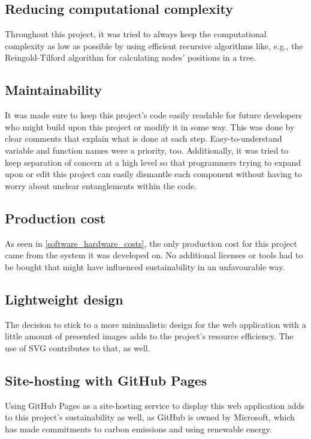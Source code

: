\subsection{Reducing computational complexity}
Throughout this project, it was tried to always keep the computational complexity as low as possible by using efficient recursive algorithms like, e.g., the Reingold-Tilford algorithm for calculating nodes' positions in a tree.

\subsection{Maintainability}
It was made sure to keep this project's code easily readable for future developers who might build upon this project or modify it in some way. This was done by clear comments that explain what is done at each step. Easy-to-understand variable and function names were a priority, too. Additionally, it was tried to keep separation of concern at a high level so that programmers trying to expand upon or edit this project can easily dismantle each component without having to worry about unclear entanglements within the code.

\subsection{Production cost}
As seen in \ref{software_hardware_costs}, the only production cost for this project came from the system it was developed on. No additional licenses or tools had to be bought that might have influenced sustainability in an unfavourable way.

\subsection{Lightweight design}
The decision to stick to a more minimalistic design for the web application with a little amount of presented images adds to the project's resource efficiency. The use of SVG contributes to that, as well.

\subsection{Site-hosting with GitHub Pages}
Using GitHub Pages as a site-hosting service to display this web application adds to this project's sustainability as well, as GitHub is owned by Microsoft, which has made commitments to carbon emissions and using renewable energy.

